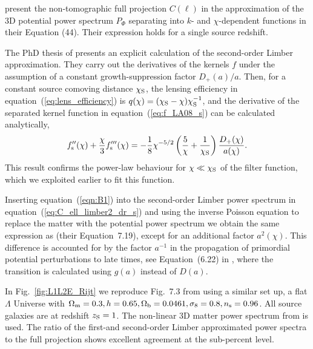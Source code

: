 \documentclass[fleqn,usenatbib]{mnras} %
\begin{document}
\begin{appendix}
\cite{2012PhRvD..86b3001B} present the non-tomographic full projection
$C(\ell)$ in the approximation of the 3D potential power spectrum $P_\Phi$
separating into $k$- and $\chi$-dependent functions in their Equation (44).
Their expression holds for a single source redshift.

The PhD thesis of \cite{vande2012} presents an explicit calculation of the
second-order Limber approximation. They carry out the derivatives of the
kernels $f$ under the assumption of a constant growth-suppression factor
$D_+(a)/a$. Then, for a constant source comoving distance $\chi_{\rm S}$, the
lensing efficiency in equation~(\ref{eq:lens_efficiency}) is $q(\chi) =
(\chi_{\rm S} - \chi) \chi_{\rm S}^{-1}$, and the derivative of the separated
kernel function in equation~(\ref{eq:f_LA08_s}) can be calculated analytically,
%
\begin{equation}
  f_{\rm s}^{\prime\prime}(\chi) + \frac{\chi}{3} f_{\rm s}^{\prime\prime\prime}(\chi)
    = - \frac 1 8 \chi^{-5/2} \left( \frac 5 \chi
          + \frac 1 {\chi_{\rm S}} \right) \frac{D_+(\chi)}{a(\chi)}.
\label{eqn:B1}
\end{equation}
%
This result confirms the power-law behaviour for $\chi \ll \chi_{\rm S}$ of the
filter function, which we exploited earlier to fit this function.

Inserting equation~(\ref{eqn:B1}) into the second-order Limber power spectrum
in equation~(\ref{eq:C_ell_limber2_dr_s}) and using the inverse Poisson
equation to replace the matter with the potential power spectrum we obtain the
same expression as \cite{vande2012} (their Equation~7.19), except for an
additional factor $a^2(\chi)$. This difference is accounted for by the factor
$a^{-1}$ in the propagation of primordial potential perturbations to late
times, see Equation~(6.22) in \cite{vande2012}, where the transition is
calculated using $g(a)$ instead of $D(a)$.

In Fig.~\ref{fig:L1L2E_Rijt} we reproduce Fig.~7.3 from \cite{vande2012} using
a similar set up, a flat $\Lambda$ Universe with $\Omega_{\rm m} = 0.3, h=0.65,
\Omega_{\rm b} = 0.0461, \sigma_8 = 0.8, n_{\rm s} = 0.96$. All source galaxies
are at redshift $z_{\rm S} = 1$. The non-linear 3D matter power spectrum from
\cite{2012ApJ...761..152T} is used. The ratio of the first-and second-order
Limber approximated power spectra to the full projection shows excellent
agreement at the sub-percent level.

\begin{figure}


\end{figure}
\end{appendix}
\end{document}
